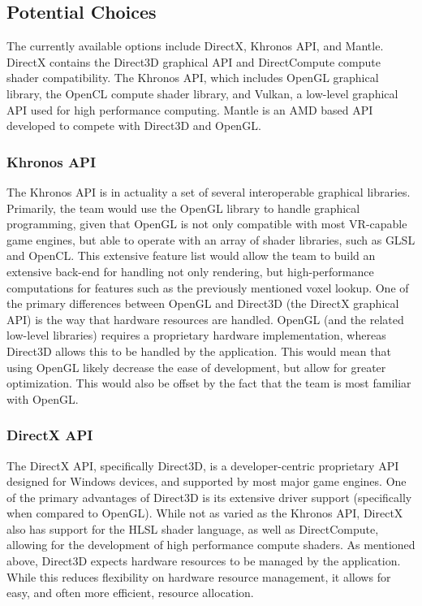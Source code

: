 \documentclass[onecolumn, draftclsnofoot,10pt, compsoc]{IEEEtran}
\begin{document}
\subsection{Potential Choices}
The currently available options include DirectX, Khronos API, and Mantle. DirectX contains the Direct3D graphical API and DirectCompute compute shader compatibility. The Khronos API, which includes OpenGL graphical library, the OpenCL compute shader library, and Vulkan, a low-level graphical API used for high performance computing. Mantle is an AMD based API developed to compete with Direct3D and OpenGL. 

\subsubsection{Khronos API}
The Khronos API is in actuality a set of several interoperable graphical libraries. Primarily, the team would use the OpenGL library to handle graphical programming, given that OpenGL is not only compatible with most VR-capable game engines, but able to operate with an array of shader libraries, such as GLSL and OpenCL. This extensive feature list would allow the team to build an extensive back-end for handling not only rendering, but high-performance computations for features such as the previously mentioned voxel lookup. One of the primary differences between OpenGL and Direct3D (the DirectX graphical API) is the way that hardware resources are handled. OpenGL (and the related low-level libraries) requires a proprietary hardware implementation, whereas Direct3D allows this to be handled by the application. This would mean that using OpenGL likely decrease the ease of development, but allow for greater optimization. This would also be offset by the fact that the team is most familiar with OpenGL.

\subsubsection{DirectX API}
The DirectX API, specifically Direct3D, is a developer-centric proprietary API designed for Windows devices, and supported by most major game engines. One of the primary advantages of Direct3D is its extensive driver support (specifically when compared to OpenGL). While not as varied as the Khronos API, DirectX also has support for the HLSL shader language, as well as DirectCompute, allowing for the development of high performance compute shaders. As mentioned above, Direct3D expects hardware resources to be managed by the application. While this reduces flexibility on hardware resource management, it allows for easy, and often more efficient, resource allocation.
\end{document}
